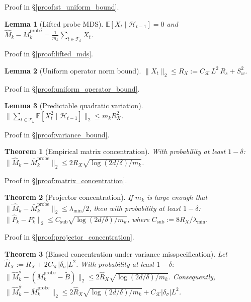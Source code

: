 \documentclass{article}
\newcommand{\E}{\mathbb{E}}
\newcommand{\cH}{\mathcal{H}}
\newcommand{\cT}{\mathcal{T}}
\newtheorem{lemma}{Lemma}
\newtheorem{theorem}{Theorem}
\begin{document}
Proof in \S\ref{proof:st_uniform_bound}.

\begin{lemma}[Lifted probe MDS]
\label{lem:lifted_mds}
$\E[X_t \mid \cH_{t-1}] = 0$ and $\widehat{M}_k - \bar{M}_k^{\mathrm{probe}} = \frac{1}{m_k}\sum_{t \in \cT_k} X_t$.
\end{lemma}

Proof in \S\ref{proof:lifted_mds}.

\begin{lemma}[Uniform operator norm bound]
\label{lem:uniform_operator_bound}
$\|X_t\|_2 \le R_X := C_{\mathcal K}\,L^2\,R_s + S_w^2$.
\end{lemma}

Proof in \S\ref{proof:uniform_operator_bound}.

\begin{lemma}[Predictable quadratic variation]
\label{lem:variance_bound}
$\|\sum_{t \in \cT_k} \E[X_t^2 \mid \cH_{t-1}]\|_2 \le m_k R_X^2$.
\end{lemma}

Proof in \S\ref{proof:variance_bound}.

\begin{theorem}[Empirical matrix concentration]
\label{thm:matrix_concentration_summary}
With probability at least $1-\delta$:
$\|\widehat{M}_k - \bar{M}_k^{\mathrm{probe}}\|_2 \le 2R_X \sqrt{\log(2d/\delta)/m_k}$.
\end{theorem}

Proof in \S\ref{proof:matrix_concentration}.

\begin{theorem}[Projector concentration]
\label{thm:projector_concentration_summary}
If $m_k$ is large enough that $\|\widehat M_k - \bar M_k^{\mathrm{probe}}\|_2 \le \lambda_{\min}/2$, then with probability at least $1-\delta$:
$\|\widehat{P}_k - P_k^\star\|_2 \le C_{\mathrm{sub}}\sqrt{\log(2d/\delta)/m_k}$, where $C_{\mathrm{sub}} := 8R_X/\lambda_{\min}$.
\end{theorem}

Proof in \S\ref{proof:projector_concentration}.

\begin{theorem}[Biased concentration under variance misspecification]
\label{thm:biased_concentration}
Let $\hat R_X := R_X + 2C_{\mathcal K}|\delta_\sigma|L^2$.
With probability at least $1-\delta$:
$\|\widehat M_k^{\hat\sigma} - (\bar M_k^{\mathrm{probe}} - \widetilde B)\|_2 \le 2\hat R_X\sqrt{\log(2d/\delta)/m_k}$.
Consequently, $\|\widehat M_k^{\hat\sigma} - \bar M_k^{\mathrm{probe}}\|_2 \le 2\hat R_X\sqrt{\log(2d/\delta)/m_k} + C_{\mathcal K}|\delta_\sigma|L^2$.
\end{theorem}
\end{document}
